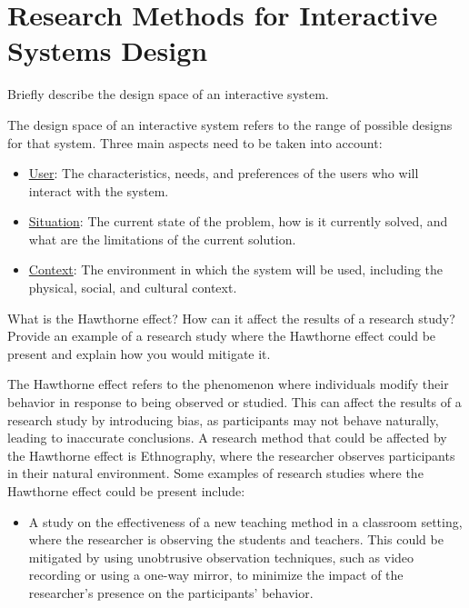 \section{Research Methods for Interactive Systems Design}

\begin{ejercicio}
    Briefly describe the design space of an interactive system.

    The design space of an interactive system refers to the range of possible designs for that system. Three main aspects need to be taken into account:
    \begin{itemize}
        \item \ul{User}: The characteristics, needs, and preferences of the users who will interact with the system.
        \item \ul{Situation}: The current state of the problem, how is it currently solved, and what are the limitations of the current solution.
        \item \ul{Context}: The environment in which the system will be used, including the physical, social, and cultural context.
    \end{itemize}
\end{ejercicio}

\begin{ejercicio}
    What is the Hawthorne effect? How can it affect the results of a research study? Provide an example of a research study where the Hawthorne effect could be present and explain how you would mitigate it.

    The Hawthorne effect refers to the phenomenon where individuals modify their behavior in response to being observed or studied. This can affect the results of a research study by introducing bias, as participants may not behave naturally, leading to inaccurate conclusions. A research method that could be affected by the Hawthorne effect is Ethnography, where the researcher observes participants in their natural environment. Some examples of research studies where the Hawthorne effect could be present include:
    \begin{itemize}
        \item A study on the effectiveness of a new teaching method in a classroom setting, where the researcher is observing the students and teachers. This could be mitigated by using unobtrusive observation techniques, such as video recording or using a one-way mirror, to minimize the impact of the researcher's presence on the participants' behavior.
    \end{itemize}
\end{ejercicio}

